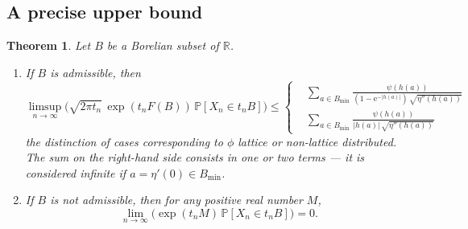 \documentclass[12pt,a4paper,reqno]{amsart}
\newtheorem{theorem}[lemma]{Theorem}
\theoremstyle{remark}
\newcommand{\R}{\mathbb{R}}
\newcommand{\E}{\mathrm{e}}
\newcommand{\proba}{\mathbb{P}}
\begin{document}
\subsection{A precise upper bound}
\begin{theorem}\label{thm:superellis}
Let $B$ be a Borelian subset of $\R$.\vspace{2mm}
\begin{enumerate}
\item\label{item:admissible} If $B$ is admissible, then
$$\limsup_{n \to \infty} \big(\sqrt{2\pi t_{n}}\,\exp(t_{n}F(B))\,\proba[X_{n} \in t_{n} B] \big) \leq \begin{cases}
&\sum_{a \in B_{\min}} \frac{\psi(h(a))}{(1-\E^{-|h(a)|})\,\sqrt{\eta''(h(a))}}\\
&\sum_{a \in B_{\min}} \frac{\psi(h(a))}{|h(a)|\,\sqrt{\eta''(h(a))}}
\end{cases}$$
the distinction of cases corresponding to $\phi$ lattice or non-lattice distributed. The sum on the right-hand side consists in one or two terms --- it is considered infinite if $a=\eta'(0) \in B_{\min}$. \vspace{2mm}
\item\label{item:nonadmissible} If $B$ is not admissible, then for any positive real number $M$,
$$\lim_{n \to \infty} \big( \exp(t_{n}M)\,\proba[X_{n} \in t_{n} B] \big)=0.$$
\end{enumerate}
\end{theorem}\medskip
\end{document}
